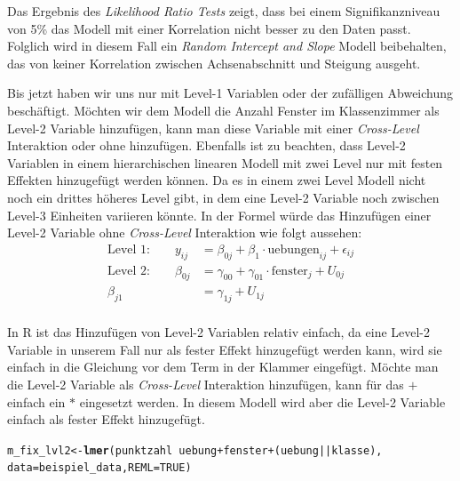 \documentclass[12pt]{article}\usepackage[]{graphicx}\usepackage[]{color}
\makeatletter
\newcommand{\hlnum}[1]{\textcolor[rgb]{0.686,0.059,0.569}{#1}}%
\newcommand{\hlopt}[1]{\textcolor[rgb]{0,0,0}{#1}}%
\newcommand{\hlstd}[1]{\textcolor[rgb]{0.345,0.345,0.345}{#1}}%
\newcommand{\hlkwb}[1]{\textcolor[rgb]{0.69,0.353,0.396}{#1}}%
\newcommand{\hlkwc}[1]{\textcolor[rgb]{0.333,0.667,0.333}{#1}}%
\newcommand{\hlkwd}[1]{\textcolor[rgb]{0.737,0.353,0.396}{\textbf{#1}}}%
\newenvironment{kframe}{%
 \def\at@end@of@kframe{}%
 \ifinner\ifhmode%
  \def\at@end@of@kframe{\end{minipage}}%
  \begin{minipage}{\columnwidth}%
 \fi\fi%
 \def\FrameCommand##1{\hskip\@totalleftmargin \hskip-\fboxsep
 \colorbox{shadecolor}{##1}\hskip-\fboxsep
     \hskip-\linewidth \hskip-\@totalleftmargin \hskip\columnwidth}%
 \MakeFramed {\advance\hsize-\width
   \@totalleftmargin\z@ \linewidth\hsize
   \@setminipage}}%
 {\par\unskip\endMakeFramed%
 \at@end@of@kframe}
\newenvironment{knitrout}{}{} %
\makeatother
\begin{document}
Das Ergebnis des \textit{Likelihood Ratio Tests} zeigt, dass bei einem Signifikanzniveau von 5\% das Modell mit einer Korrelation nicht besser zu den Daten passt. Folglich wird in diesem Fall ein \textit{Random Intercept and Slope} Modell beibehalten, das von keiner Korrelation zwischen Achsenabschnitt und Steigung ausgeht.

Bis jetzt haben wir uns nur mit Level-1 Variablen oder der zufälligen Abweichung beschäftigt. Möchten wir dem Modell die Anzahl Fenster im Klassenzimmer als Level-2 Variable hinzufügen, kann man diese Variable mit einer \textit{Cross-Level} Interaktion oder ohne hinzufügen. Ebenfalls ist zu beachten, dass Level-2 Variablen in einem hierarchischen linearen Modell mit zwei Level nur mit festen Effekten hinzugefügt werden können. Da es in einem zwei Level Modell nicht noch ein drittes höheres Level gibt, in dem eine Level-2 Variable noch zwischen Level-3 Einheiten variieren könnte. In der Formel würde das Hinzufügen einer Level-2 Variable ohne \textit{Cross-Level} Interaktion wie folgt aussehen:
\begin{equation} 
\begin{split}	
 \text{Level 1:}  \qquad y_{ij} & = \beta_{0j} + \beta_{1} \cdot \text{uebungen}_{ij} + \epsilon_{ij}\\
 \text{Level 2:} \qquad \beta_{0j} & = \gamma_{00} + \gamma_{01} \cdot \text{fenster}_{j} + U_{0j}\\
 \beta_{j1} & = \gamma_{1j} + U_{1j}\\
\end{split}	
\end{equation} 

In R ist das Hinzufügen von Level-2 Variablen relativ einfach, da eine Level-2 Variable in unserem Fall nur als fester Effekt hinzugefügt werden kann, wird sie einfach in die Gleichung vor dem Term in der Klammer eingefügt. Möchte man die Level-2 Variable als \textit{Cross-Level} Interaktion hinzufügen, kann für das $+$ einfach ein $*$ eingesetzt werden. In diesem Modell wird aber die Level-2 Variable einfach als fester Effekt hinzugefügt.

\singlespacing
\begin{knitrout}
\color{fgcolor}\begin{kframe}
\begin{alltt}
\hlstd{m_fix_lvl2} \hlkwb{<-} \hlkwd{lmer}\hlstd{(punktzahl} \hlopt{~} \hlstd{uebung} \hlopt{+} \hlstd{fenster} \hlopt{+} \hlstd{(uebung} \hlopt{||} \hlstd{klasse),}
        \hlkwc{data} \hlstd{= beispiel_data,} \hlkwc{REML} \hlstd{=} \hlnum{TRUE}\hlstd{)}
\end{alltt}
\end{kframe}
\end{knitrout}
\end{document}
